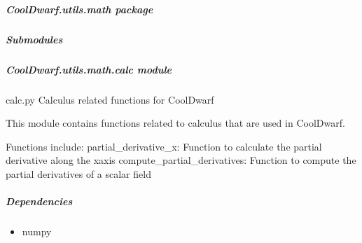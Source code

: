 \documentclass[letterpaper,10pt,english]{sphinxmanual}
\begin{document}
\subparagraph{CoolDwarf.utils.math package}
\label{\detokenize{CoolDwarf.utils.math:cooldwarf-utils-math-package}}\label{\detokenize{CoolDwarf.utils.math::doc}}

\subparagraph{Submodules}
\label{\detokenize{CoolDwarf.utils.math:submodules}}

\subparagraph{CoolDwarf.utils.math.calc module}
\label{\detokenize{CoolDwarf.utils.math:module-CoolDwarf.utils.math.calc}}\label{\detokenize{CoolDwarf.utils.math:cooldwarf-utils-math-calc-module}}
\sphinxAtStartPar
calc.py \textendash{} Calculus related functions for CoolDwarf

\sphinxAtStartPar
This module contains functions related to calculus that are used in CoolDwarf.

\sphinxAtStartPar
Functions include:
\sphinxhyphen{} partial\_derivative\_x: Function to calculate the partial derivative along the x\sphinxhyphen{}axis
\sphinxhyphen{} compute\_partial\_derivatives: Function to compute the partial derivatives of a scalar field


\subparagraph{Dependencies}
\label{\detokenize{CoolDwarf.utils.math:dependencies}}\begin{itemize}
\item {} 
\sphinxAtStartPar
numpy

\end{itemize}
\end{document}
